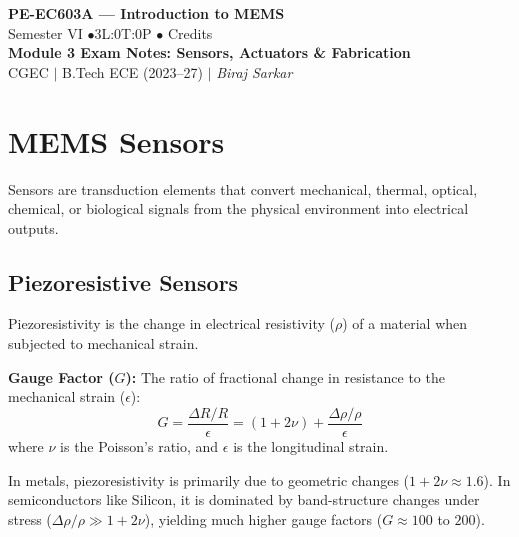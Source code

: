 \documentclass[12pt,a4paper]{article}
\begin{document}

\begin{center}
  {\LARGE\bfseries\color{myred} PE-EC603A --- Introduction to MEMS}\\[5pt]
  {\normalsize\color{mydark} Semester VI \quad$\bullet$\quad 3L:0T:0P \quad$\bullet$ Credits}\\[3pt]
  {\normalsize\color{myteal}\textbf{Module 3 Exam Notes: Sensors, Actuators \& Fabrication}}\\[3pt]
  {\small\color{mydark} CGEC \;$|$\; B.Tech ECE (2023--27) \;$|$\; \textit{Biraj Sarkar}}
\end{center}
\vspace{2pt}
\noindent{\color{myred}\rule{\linewidth}{1.5pt}}
\vspace{2pt}

\hypersetup{linkcolor=mydark}
\tableofcontents
\hypersetup{linkcolor=myteal}
\newpage

\section{MEMS Sensors}

Sensors are transduction elements that convert mechanical, thermal, optical, chemical, or biological signals from the physical environment into electrical outputs.

\subsection{Piezoresistive Sensors}
Piezoresistivity is the change in electrical resistivity ($\rho$) of a material when subjected to mechanical strain.
\begin{tcolorbox}[defbox]
\textbf{Gauge Factor ($G$):} The ratio of fractional change in resistance to the mechanical strain ($\epsilon$):
$$G = \frac{\Delta R / R}{\epsilon} = (1 + 2\nu) + \frac{\Delta\rho/\rho}{\epsilon}$$
where $\nu$ is the Poisson's ratio, and $\epsilon$ is the longitudinal strain.
\end{tcolorbox}
In metals, piezoresistivity is primarily due to geometric changes ($1+2\nu \approx 1.6$). In semiconductors like Silicon, it is dominated by band-structure changes under stress ($\Delta\rho/\rho \gg 1+2\nu$), yielding much higher gauge factors ($G \approx 100$ to $200$).
\end{document}

